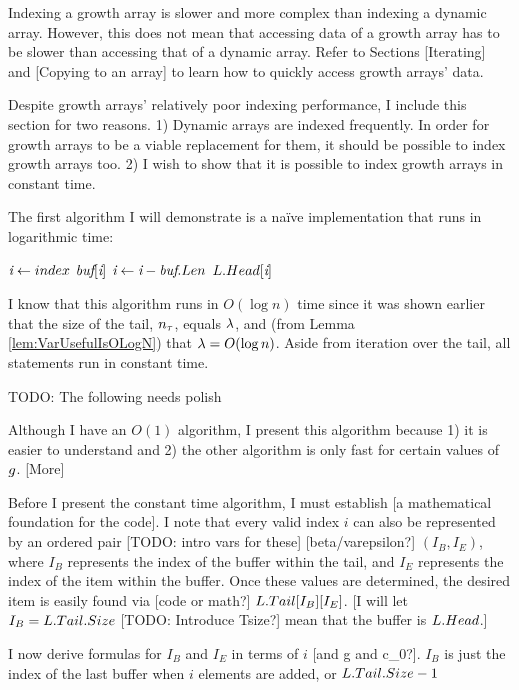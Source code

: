 \HdrGrowthArrayImpl

Indexing a growth array is slower and more complex than indexing a dynamic array. However, this does not mean that accessing data of a growth array has to be slower than accessing that of a dynamic array. Refer to Sections [Iterating] and [Copying to an array] to learn how to quickly access growth arrays' data.

Despite growth arrays' relatively poor indexing performance, I include this section for two reasons. 1) Dynamic arrays are indexed frequently. In order for growth arrays to be a viable replacement for them, it should be possible to index growth arrays too. 2) I wish to show that it is possible to index growth arrays in constant time.

The first algorithm I will demonstrate is a na\"{i}ve implementation that runs in logarithmic time:

\begin{algorithm}
	\begin{algorithmic}
			\State $\textit{i} \gets index$
					\State \Return $\textit{buf}[\textit{i}]$
				\EndIf
				\State $\textit{i} \gets \textit{i} - \textit{buf}.Len$
			\EndFor
			\State \Return $L.Head[\textit{i}]$
		\EndFunction
	\end{algorithmic}
\end{algorithm}

I know that this algorithm runs in $O(\log n)$ time since it was shown earlier that the size of the tail, $n_\tau$, equals $\lambda$, and (from Lemma \ref{lem:VarUsefulIsOLogN}) that $\lambda = O(\log n)$. Aside from iteration over the tail, all statements run in constant time.

TODO: The following needs polish

Although I have an $O(1)$ algorithm, I present this algorithm because 1) it is easier to understand and 2) the other algorithm is only fast for certain values of $g$. [More]

Before I present the constant time algorithm, I must establish [a mathematical foundation for the code]. I note that every valid index $i$ can also be represented by an ordered pair [TODO: intro vars for these] [beta/varepsilon?] $(I_B, I_E)$, where $I_B$ represents the index of the buffer within the tail, and $I_E$ represents the index of the item within the buffer. Once these values are determined, the desired item is easily found via [code or math?] $L.Tail[I_B][I_E]$. [I will let $I_B = L.Tail.Size$ [TODO: Introduce Tsize?] mean that the buffer is $L.Head$.]

I now derive formulas for $I_B$ and $I_E$ in terms of $i$ [and g and c_0?]. $I_B$ is just the index of the last buffer when $i$ elements are added, or $L.Tail.Size - 1$

